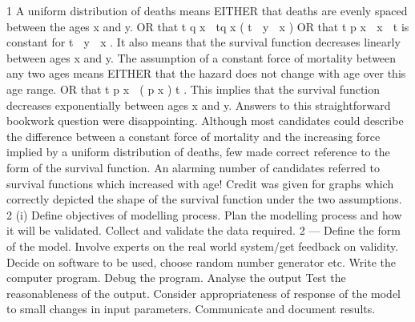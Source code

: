 \documentclass[a4paper,12pt]{article}
\begin{document}
\begin{enumerate}
1
A uniform distribution of deaths means
EITHER
that deaths are evenly spaced between the ages x and y.
OR
that t q x  tq x
( t  y  x )
OR
that t p x  x  t is constant for t  y  x .
It also means that the survival function decreases linearly between ages x and y. The
assumption of a constant force of mortality between any two ages means
EITHER
that the hazard does not change with age over this age range.
OR
that t p x  ( p x ) t .
This implies that the survival function decreases exponentially between ages x and y.
Answers to this straightforward bookwork question were disappointing. Although
most candidates could describe the difference between a constant force of mortality
and the increasing force implied by a uniform distribution of deaths, few made correct reference to the form of the survival function. An alarming number of candidates
referred to survival functions which increased with age! Credit was given for graphs which correctly depicted the shape of the survival function under the two
assumptions.
2
(i) Define objectives of modelling process.
Plan the modelling process and how it will be validated.
Collect and validate the data required.
2  — %
Define the form of the model.
Involve experts on the real world system/get feedback on validity.
Decide on software to be used, choose random number generator etc.
Write the computer program.
Debug the program.
Analyse the output
Test the reasonableness of the output.
Consider appropriateness of response of the model to small changes in input
parameters.
Communicate and document results.


\end{enumerate}
\end{document}
